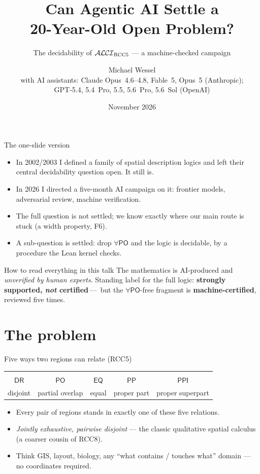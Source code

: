 \documentclass[aspectratio=169,11pt]{beamer}
\title{Can Agentic AI Settle a\\ 20-Year-Old Open Problem?}
\subtitle{The decidability of $\mathcal{ALCI}_{\mathrm{RCC5}}$ --- a machine-checked campaign}
\author{Michael Wessel\\[2pt]
  {\small with AI assistants: Claude Opus~4.6--4.8, Fable~5, Opus~5 (Anthropic);\\
  GPT-5.4, 5.4~Pro, 5.5, 5.6~Pro, 5.6~Sol (OpenAI)}}
\date{November 2026}
\newcommand{\DR}{\mathsf{DR}}
\newcommand{\PO}{\mathsf{PO}}
\newcommand{\PP}{\mathsf{PP}}
\newcommand{\PPI}{\mathsf{PPI}}
\newcommand{\EQ}{\mathsf{EQ}}
\newcommand{\statuslabel}{\textcolor{openc}{\textbf{strongly supported, \emph{not} certified}}}
\newcommand{\picDR}{\begin{tikzpicture}[scale=.5,baseline=-2pt]
  \draw[thick,petrol] (0,0) circle (.30); \draw[thick,warm] (.85,0) circle (.30);
\end{tikzpicture}}
\newcommand{\picPO}{\begin{tikzpicture}[scale=.5,baseline=-2pt]
  \draw[thick,petrol] (0,0) circle (.30); \draw[thick,warm] (.38,0) circle (.30);
\end{tikzpicture}}
\newcommand{\picEQ}{\begin{tikzpicture}[scale=.5,baseline=-2pt]
  \draw[thick,petrol] (0,0) circle (.30); \draw[thick,warm,dashed] (0,0) circle (.24);
\end{tikzpicture}}
\newcommand{\picPP}{\begin{tikzpicture}[scale=.5,baseline=-2pt]
  \draw[thick,warm] (0,0) circle (.32); \draw[thick,petrol] (-.09,-.05) circle (.16);
\end{tikzpicture}}
\newcommand{\picPPI}{\begin{tikzpicture}[scale=.5,baseline=-2pt]
  \draw[thick,petrol] (0,0) circle (.32); \draw[thick,warm] (.09,-.05) circle (.16);
\end{tikzpicture}}
\begin{document}
\maketitle

\begin{frame}{The one-slide version}
\begin{itemize}
  \item In 2002/2003 I defined a family of \alert{spatial description logics}
        and left their central decidability question \alert{open}. It still is.
  \item In 2026 I directed a \alert{five-month AI campaign} on it:
        frontier models, adversarial review, machine verification.
  \item The \alert{full} question is \alert{not settled}; we know exactly
        where our main route is stuck (a width property, F6).
  \item A \alert{sub-question is settled}: drop $\forall\PO$ and the logic is
        \alert{decidable}, by a procedure the \alert{Lean kernel checks}.
\end{itemize}
\vfill
\begin{block}{How to read everything in this talk}
  The mathematics is AI-produced and \emph{unverified by human experts}.
  Standing label for the \alert{full logic}: \statuslabel{}\,---\,%
  but the $\forall\PO$-free fragment is
  \textcolor{good}{\textbf{machine-certified}}, reviewed five times.
\end{block}
\end{frame}

\section{The problem}
\begin{frame}{Five ways two regions can relate (RCC5)}
\begin{center}
\renewcommand{\arraystretch}{1.3}
\begin{tabular}{ccccc}
  \picDR & \picPO & \picEQ & \picPP & \picPPI\\[4pt]
  $\DR$ & $\PO$ & $\EQ$ & $\PP$ & $\PPI$\\
  disjoint & partial overlap & equal & proper part & proper superpart
\end{tabular}
\end{center}
\vfill
\begin{itemize}
  \item Every pair of regions stands in \alert{exactly one} of these five relations.
  \item \emph{Jointly exhaustive, pairwise disjoint} --- the classic
        qualitative spatial calculus (a coarser cousin of RCC8).
  \item Think GIS, layout, biology, any ``what contains / touches what''
        domain --- \alert{no coordinates required}.
\end{itemize}
\end{frame}
\end{document}
